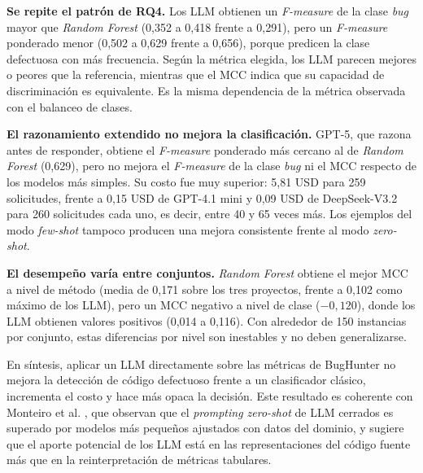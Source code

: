 \textbf{Se repite el patrón de RQ4.} Los LLM obtienen un \textit{F-measure} de la clase \textit{bug} mayor que \textit{Random Forest} (0,352 a 0,418 frente a 0,291), pero un \textit{F-measure} ponderado menor (0,502 a 0,629 frente a 0,656), porque predicen la clase defectuosa con más frecuencia. Según la métrica elegida, los LLM parecen mejores o peores que la referencia, mientras que el MCC indica que su capacidad de discriminación es equivalente. Es la misma dependencia de la métrica observada con el balanceo de clases.

\textbf{El razonamiento extendido no mejora la clasificación.} GPT-5, que razona antes de responder, obtiene el \textit{F-measure} ponderado más cercano al de \textit{Random Forest} (0,629), pero no mejora el \textit{F-measure} de la clase \textit{bug} ni el MCC respecto de los modelos más simples. Su costo fue muy superior: 5,81 USD para 259 solicitudes, frente a 0,15 USD de GPT-4.1 mini y 0,09 USD de DeepSeek-V3.2 para 260 solicitudes cada uno, es decir, entre 40 y 65 veces más. Los ejemplos del modo \textit{few-shot} tampoco producen una mejora consistente frente al modo \textit{zero-shot}.

\textbf{El desempeño varía entre conjuntos.} \textit{Random Forest} obtiene el mejor MCC a nivel de método (media de 0,171 sobre los tres proyectos, frente a 0,102 como máximo de los LLM), pero un MCC negativo a nivel de clase ($-0{,}120$), donde los LLM obtienen valores positivos (0,014 a 0,116). Con alrededor de 150 instancias por conjunto, estas diferencias por nivel son inestables y no deben generalizarse.

En síntesis, aplicar un LLM directamente sobre las métricas de BugHunter no mejora la detección de código defectuoso frente a un clasificador clásico, incrementa el costo y hace más opaca la decisión. Este resultado es coherente con Monteiro et al. \cite{monteiro2026jit}, que observan que el \textit{prompting zero-shot} de LLM cerrados es superado por modelos más pequeños ajustados con datos del dominio, y sugiere que el aporte potencial de los LLM está en las representaciones del código fuente \cite{jaiswal2026llm} más que en la reinterpretación de métricas tabulares.
